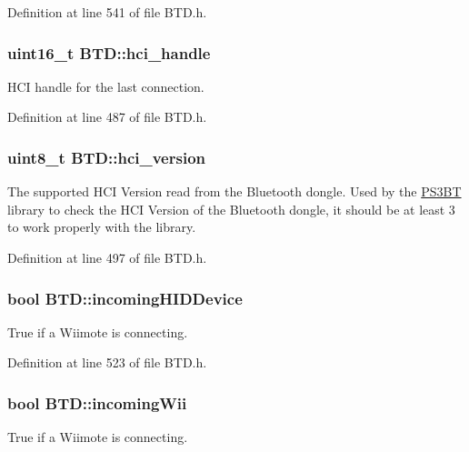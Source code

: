 \-Definition at line 541 of file \-B\-T\-D.\-h.

\hypertarget{class_b_t_d_aa3bb6c692701cb33dfad1ea4d68b6f98}{
\subsubsection[{hci\-\_\-handle}]{\setlength{\rightskip}{0pt plus 5cm}uint16\-\_\-t {\bf \-B\-T\-D\-::hci\-\_\-handle}}}\label{class_b_t_d_aa3bb6c692701cb33dfad1ea4d68b6f98}
\-H\-C\-I handle for the last connection. 

\-Definition at line 487 of file \-B\-T\-D.\-h.

\hypertarget{class_b_t_d_addaddee110af23a3195ad56f631e69ea}{
\subsubsection[{hci\-\_\-version}]{\setlength{\rightskip}{0pt plus 5cm}uint8\-\_\-t {\bf \-B\-T\-D\-::hci\-\_\-version}}}\label{class_b_t_d_addaddee110af23a3195ad56f631e69ea}
\-The supported \-H\-C\-I \-Version read from the \-Bluetooth dongle. \-Used by the \hyperlink{class_p_s3_b_t}{\-P\-S3\-B\-T} library to check the \-H\-C\-I \-Version of the \-Bluetooth dongle, it should be at least 3 to work properly with the library. 

\-Definition at line 497 of file \-B\-T\-D.\-h.

\hypertarget{class_b_t_d_a685d6371fb0c950ff6bad4510a8cc85a}{
\subsubsection[{incoming\-H\-I\-D\-Device}]{\setlength{\rightskip}{0pt plus 5cm}bool {\bf \-B\-T\-D\-::incoming\-H\-I\-D\-Device}}}\label{class_b_t_d_a685d6371fb0c950ff6bad4510a8cc85a}
\-True if a \-Wiimote is connecting. 

\-Definition at line 523 of file \-B\-T\-D.\-h.

\hypertarget{class_b_t_d_a4dc8f94fe85028f3d54f13dde1e5b4ee}{
\subsubsection[{incoming\-Wii}]{\setlength{\rightskip}{0pt plus 5cm}bool {\bf \-B\-T\-D\-::incoming\-Wii}}}\label{class_b_t_d_a4dc8f94fe85028f3d54f13dde1e5b4ee}
\-True if a \-Wiimote is connecting. 

